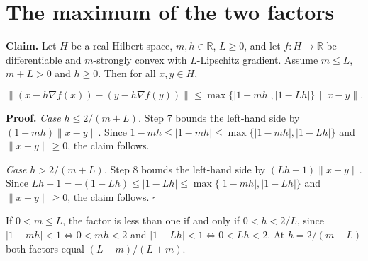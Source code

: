 \documentclass[11pt,a4paper]{article}
\begin{document}
\section{\texorpdfstring{The maximum of the two factors}{The maximum of the two factors}}


\textbf{Claim.} Let \(H\) be a real Hilbert space, \(m,h\in\mathbb R\), \(L\ge0\), and let \(f:H\to\mathbb R\) be differentiable and \(m\)-strongly convex with \(L\)-Lipschitz gradient. Assume \(m\le L\), \(m+L>0\) and \(h\ge0\). Then for all \(x,y\in H\),


\[\|(x-h\nabla f(x))-(y-h\nabla f(y))\|\le\max\{|1-mh|,|1-Lh|\}\,\|x-y\|.\]


\textbf{Proof.} \emph{Case \(h\le2/(m+L)\).} Step 7 bounds the left-hand side by \((1-mh)\|x-y\|\). Since \(1-mh\le|1-mh|\le\max\{|1-mh|,|1-Lh|\}\) and \(\|x-y\|\ge0\), the claim follows.




\emph{Case \(h>2/(m+L)\).} Step 8 bounds the left-hand side by \((Lh-1)\|x-y\|\). Since \(Lh-1=-(1-Lh)\le|1-Lh|\le\max\{|1-mh|,|1-Lh|\}\) and \(\|x-y\|\ge0\), the claim follows. \(\square\)




If \(0<m\le L\), the factor is less than one if and only if \(0<h<2/L\), since \(|1-mh|<1\iff0<mh<2\) and \(|1-Lh|<1\iff0<Lh<2\). At \(h=2/(m+L)\) both factors equal \((L-m)/(L+m)\).
\end{document}
